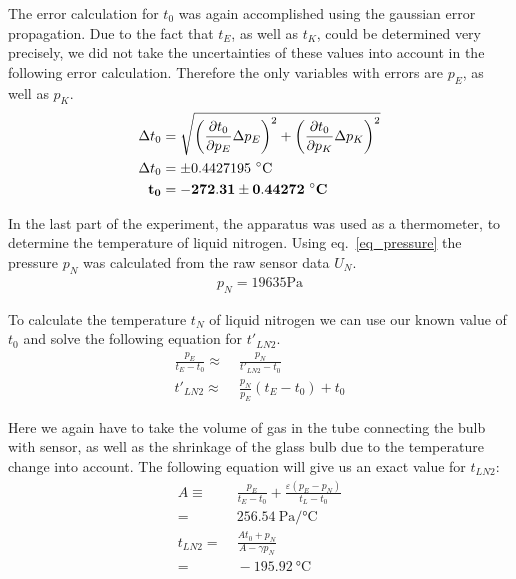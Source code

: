     The error calculation for $t_0$ was again accomplished using the gaussian error propagation.
    Due to the fact that $t_E$, as well as $t_K$, could be determined very precisely, we did not take
    the uncertainties of these values into account in the following error calculation.
    Therefore the only variables with errors are $p_E$, as well as $p_K$. %
    \begin{align}
        \Delta t_0 &= \sqrt{ \left(\frac{\partial t_0}{\partial p_E} \Delta p_E \right)^2 +
                            \left(\frac{\partial t_0}{\partial p_K} \Delta p_K \right)^2 }\\
        \Delta t_0 &= \pm 0.4427195~\si{\celsius} \label{dlta_t0}\\
        \bf t_0 &= \bf -272.31 \pm 0.44272~\si{\bf\celsius} \label{res_t0}
    \end{align}

    In the last part of the experiment, the apparatus was used as a thermometer, to determine the 
    temperature of liquid nitrogen.
    Using eq.~\ref{eq_pressure} the pressure $p_N$ was calculated from the raw sensor data $U_N$.
    \begin{align}
        p_N = 19635 \si{\pascal}
    \end{align}

    To calculate the temperature $t_N$ of liquid nitrogen we can use our known value of $t_0$ and solve
    the following equation for $t'_{LN2}$. %
    \begin{align}
        \frac{p_E}{t_E - t_0} \approx& \; \frac{p_N}{t'_{LN2} - t_0}\\
        t'_{LN2} \approx& \; \frac{p_N}{p_E}(t_E - t_0) + t_0
    \end{align}

    Here we again have to take the volume of gas in the tube connecting the bulb with sensor,
    as well as the shrinkage of the glass bulb due to the temperature change into account.
    The following equation will give us an exact value for $t_{LN2}$:
    \begin{align}
        A \equiv& \; \frac{p_E}{t_E - t_0} + \frac{\varepsilon(p_E - p_N)}{t_L - t_0}\\
        =& \; 256.54~\si{\pascal/\celsius}\\
        t_{LN2} =& \; \frac{A t_0 + p_N}{A - \gamma p_N}\\
        =& \; -195.92~\si{\celsius} \label{val_tN}
    \end{align}

